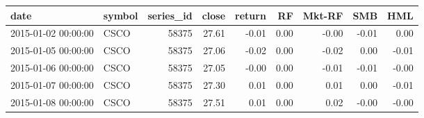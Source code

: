 \begin{tabular}{llrrrrrrr}
\toprule
date & symbol & series\_id & close & return & RF & Mkt-RF & SMB & HML \\
\midrule
2015-01-02 00:00:00 & CSCO & 58375 & 27.61 & -0.01 & 0.00 & -0.00 & -0.01 & 0.00 \\
2015-01-05 00:00:00 & CSCO & 58375 & 27.06 & -0.02 & 0.00 & -0.02 & 0.00 & -0.01 \\
2015-01-06 00:00:00 & CSCO & 58375 & 27.05 & -0.00 & 0.00 & -0.01 & -0.01 & -0.00 \\
2015-01-07 00:00:00 & CSCO & 58375 & 27.30 & 0.01 & 0.00 & 0.01 & 0.00 & -0.01 \\
2015-01-08 00:00:00 & CSCO & 58375 & 27.51 & 0.01 & 0.00 & 0.02 & -0.00 & -0.00 \\
\bottomrule
\end{tabular}
